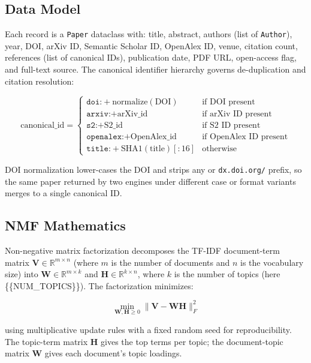 \documentclass[
]{article}
\begin{document}
\subsection{Data Model}\label{data-model}

Each record is a \texttt{Paper} dataclass with: title, abstract, authors
(list of \texttt{Author}), year, DOI, arXiv ID, Semantic Scholar ID,
OpenAlex ID, venue, citation count, references (list of canonical IDs),
publication date, PDF URL, open-access flag, and full-text source. The
canonical identifier hierarchy governs de-duplication and citation
resolution:

\[
\text{canonical\_id} = \begin{cases}
\texttt{doi:} + \text{normalize}(\text{DOI}) & \text{if DOI present} \\
\texttt{arxiv:} + \text{arXiv\_id} & \text{if arXiv ID present} \\
\texttt{s2:} + \text{S2\_id} & \text{if S2 ID present} \\
\texttt{openalex:} + \text{OpenAlex\_id} & \text{if OpenAlex ID present} \\
\texttt{title:} + \text{SHA1}(\text{title})[:16] & \text{otherwise}
\end{cases}
\]

DOI normalization lower-cases the DOI and strips any
 or \texttt{dx.doi.org/} prefix, so the same
paper returned by two engines under different case or format variants
merges to a single canonical ID.

\subsection{NMF Mathematics}\label{nmf-mathematics}

Non-negative matrix factorization decomposes the TF-IDF document-term
matrix \(\mathbf{V} \in \mathbb{R}^{m \times n}\) (where \(m\) is the
number of documents and \(n\) is the vocabulary size) into
\(\mathbf{W} \in \mathbb{R}^{m \times k}\) and
\(\mathbf{H} \in \mathbb{R}^{k \times n}\), where \(k\) is the number of
topics (here \{\{NUM\_TOPICS\}\}). The factorization minimizes:

\[
\min_{\mathbf{W}, \mathbf{H} \geq 0} \|\mathbf{V} - \mathbf{W} \mathbf{H}\|_F^2
\]

using multiplicative update rules \citep{lee1999learning} with a fixed
random seed for reproducibility. The topic-term matrix \(\mathbf{H}\)
gives the top terms per topic; the document-topic matrix \(\mathbf{W}\)
gives each document's topic loadings.
\end{document}
